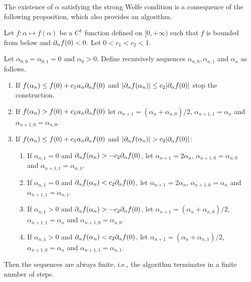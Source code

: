 The existence of $\alpha$ satisfying the strong Wolfe condition is a consequence of the following proposition, which also provides an algorithm.
\begin{proposition}
Let $f: \alpha \mapsto f(\alpha)$ be a $C^1$ function defined on $[0, +\infty)$ such that $f$ is bounded from below and $\partial_\alpha f(0) < 0$. Let $0 < c_1 < c_2 < 1$. 

Let $\alpha_{0,0} = \alpha_{0,1} = 0$ and $\alpha_0 > 0$. Define recursively sequences $\alpha_{n,0}, \alpha_{n,1}$ and $\alpha_{n}$ as follows. 
\begin{enumerate}[label=(\roman*)]
\item If  $f(\alpha_n) \leq  f(0) + c_1\alpha_n \partial_\alpha f(0)$ and  $|\partial_\alpha f(\alpha_n)| \leq c_2 |\partial_\alpha f(0)|$ stop the construction.
\item If $f(\alpha_n) >  f(0) + c_1\alpha_n \partial_\alpha f(0)$ 
let $\alpha_{n+1} = (\alpha_n+\alpha_{n,0})/2$, $\alpha_{n+1,1} = \alpha_{n}$ and $\alpha_{n+1,0} = \alpha_{n,0}$.
\item If $f(\alpha_n) \leq  f(0) + c_1\alpha_n \partial_\alpha f(0)$ and $|\partial_\alpha f(\alpha_n)| > c_2 |\partial_\alpha f(0)|$:
\begin{enumerate}[label = (\alph*),itemindent=1cm]
\item If $\alpha_{n,1}=0$ and $\partial_\alpha f(\alpha_n) > -c_2 \partial_\alpha f(0)$, let  $\alpha_{n+1} = 2\alpha_n$, $\alpha_{n+1,0} = \alpha_{n,0}$ and $\alpha_{n+1,1} = \alpha_{n,1}$.
\item If $\alpha_{n,1}=0$ and $\partial_\alpha f(\alpha_n) < c_2 \partial_\alpha f(0)$, let  $\alpha_{n+1} = 2\alpha_n$, $\alpha_{n+1,0} = \alpha_{n}$ and $\alpha_{n+1,1} = \alpha_{n,1}$.
\item If $\alpha_{n,1}>0$ and $\partial_\alpha f(\alpha_n) > - c_2 \partial_\alpha f(0)$, let 
$\alpha_{n+1} = (\alpha_n+\alpha_{n,0})/2$, $\alpha_{n+1,1} = \alpha_{n}$ and $\alpha_{n+1,0} = \alpha_{n,0}$.
\item If $\alpha_{n,1}>0$ and $\partial_\alpha f(\alpha_n) < c_2 \partial_\alpha f(0)$, let 
$\alpha_{n+1} = (\alpha_n+\alpha_{n,1})/2$, $\alpha_{n+1,0} = \alpha_{n}$ and $\alpha_{n+1,1} = \alpha_{n,1}$.
\end{enumerate}
\end{enumerate} 
Then the sequences are always finite, i.e., the algorithm terminates in a finite number of steps.

\label{prop:line.search}
\end{proposition}

